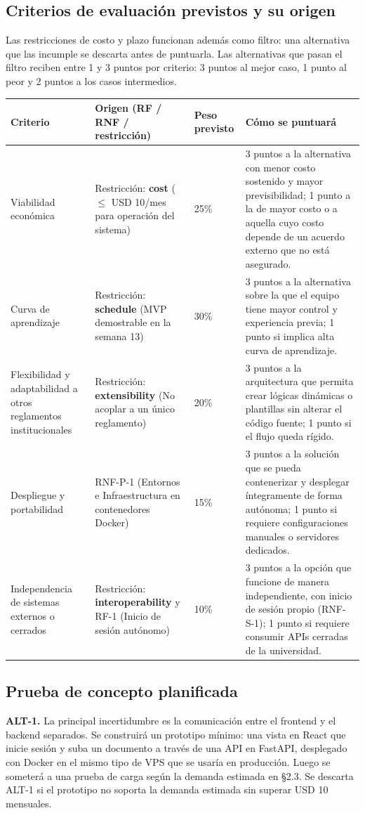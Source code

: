 \documentclass[10pt,a4paper]{article}
\newcommand{\hrow}{\rowcolor{encabezado}}
\newcommand{\h}[1]{\textbf{#1}}
\begin{document}
\subsection{Criterios de evaluación previstos y su origen}
Las restricciones de costo y plazo funcionan además como filtro: una alternativa que las incumple se descarta antes de puntuarla. Las alternativas que pasan el filtro reciben entre 1 y 3 puntos por criterio: 3 puntos al mejor caso, 1 punto al peor y 2 puntos a los casos intermedios.

\begin{xltabular}{\linewidth}{|L|P{4.2cm}|P{2.8cm}|P{3.6cm}|}
\hline\hrow \h{Criterio} & \h{Origen (RF / RNF / restricción)} & \h{Peso previsto} & \h{Cómo se puntuará} \\ \hline
\endhead
Viabilidad económica & Restricción: \textbf{cost} ($\le$ USD 10/mes para operación del sistema) & 25\% & 3 puntos a la alternativa con menor costo sostenido y mayor previsibilidad; 1 punto a la de mayor costo o a aquella cuyo costo depende de un acuerdo externo que no está asegurado. \\ \hline
Curva de aprendizaje & Restricción: \textbf{schedule} (MVP demostrable en la semana 13) & 30\% & 3 puntos a la alternativa sobre la que el equipo tiene mayor control y experiencia previa; 1 punto si implica alta curva de aprendizaje. \\ \hline
Flexibilidad y adaptabilidad a otros reglamentos institucionales & Restricción: \textbf{extensibility} (No acoplar a un único reglamento) & 20\% & 3 puntos a la arquitectura que permita crear lógicas dinámicas o plantillas sin alterar el código fuente; 1 punto si el flujo queda rígido. \\ \hline
Despliegue y portabilidad & RNF-P-1 (Entornos e Infraestructura en contenedores Docker) & 15\% & 3 puntos a la solución que se pueda contenerizar y desplegar íntegramente de forma autónoma; 1 punto si requiere configuraciones manuales o servidores dedicados. \\ \hline
Independencia de sistemas externos o cerrados & Restricción: \textbf{interoperability} y RF-1 (Inicio de sesión autónomo) & 10\% & 3 puntos a la opción que funcione de manera independiente, con inicio de sesión propio (RNF-S-1); 1 punto si requiere consumir APIs cerradas de la universidad. \\ \hline
\end{xltabular}

\subsection{Prueba de concepto planificada}
\textbf{ALT-1.} La principal incertidumbre es la comunicación entre el frontend y el backend separados. Se construirá un prototipo mínimo: una vista en React que inicie sesión y suba un documento a través de una API en FastAPI, desplegado con Docker en el mismo tipo de VPS que se usaría en producción. Luego se someterá a una prueba de carga según la demanda estimada en §2.3. Se descarta ALT-1 si el prototipo no soporta la demanda estimada sin superar USD 10 mensuales.
\end{document}
